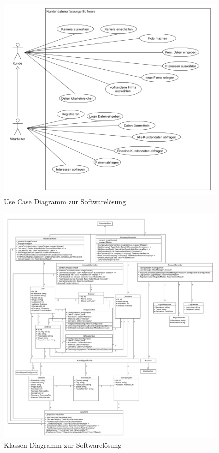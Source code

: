 \begin{figure}[h]
	\centering
	\includegraphics[width=\linewidth]{Images/Projekt_Messe_UseCase}
	\caption{Use Case Diagramm zur Softwarelösung}
	\label{fig:projektmesseusecase}
\end{figure}

\begin{figure}[h]
	\centering
	\includegraphics[width=1.1\linewidth]{Images/Projekt_Messe_Class1}
	\caption{Klassen-Diagramm zur Softwarelösung}
	\label{fig:projektmesseclass}
\end{figure}

